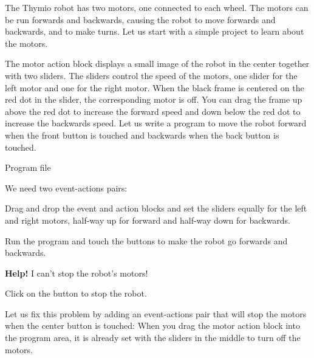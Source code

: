 
\label{ch.moving}


The Thymio robot has two motors, one connected to each wheel. The motors
can be run forwards and backwards, causing the robot to move forwards
and backwards, and to make turns. Let us start with a simple project to
learn about the motors.

The motor action block  displays a small image of
the robot in the center together with two sliders. The sliders control
the speed of the motors, one slider for the left motor and one for the
right motor. When the black frame is centered on the red dot in the
slider, the corresponding motor is off. You can drag the frame up above
the red dot to increase the forward speed and down below the red dot to
increase the backwards speed. Let us write a program to move the robot
forward when the front button is touched and backwards when the back
button is touched.

{\raggedleft \hfill Program file }

We need two event-actions pairs:

\begin{center}
\end{center}

Drag and drop the event and action blocks and set the sliders equally
for the left and right motors, half-way up for forward and half-way down
for backwards.

Run the program and touch the buttons to make the robot go forwards and
backwards.


\textbf{Help!} I can't stop the robot's motors!

Click on the button  to stop the robot.

\newpage

Let us fix this problem by adding an event-actions pair that will stop
the motors when the center button is touched:
When you drag the motor action block into the program area, it is
already set with the sliders in the middle to turn off the motors.


